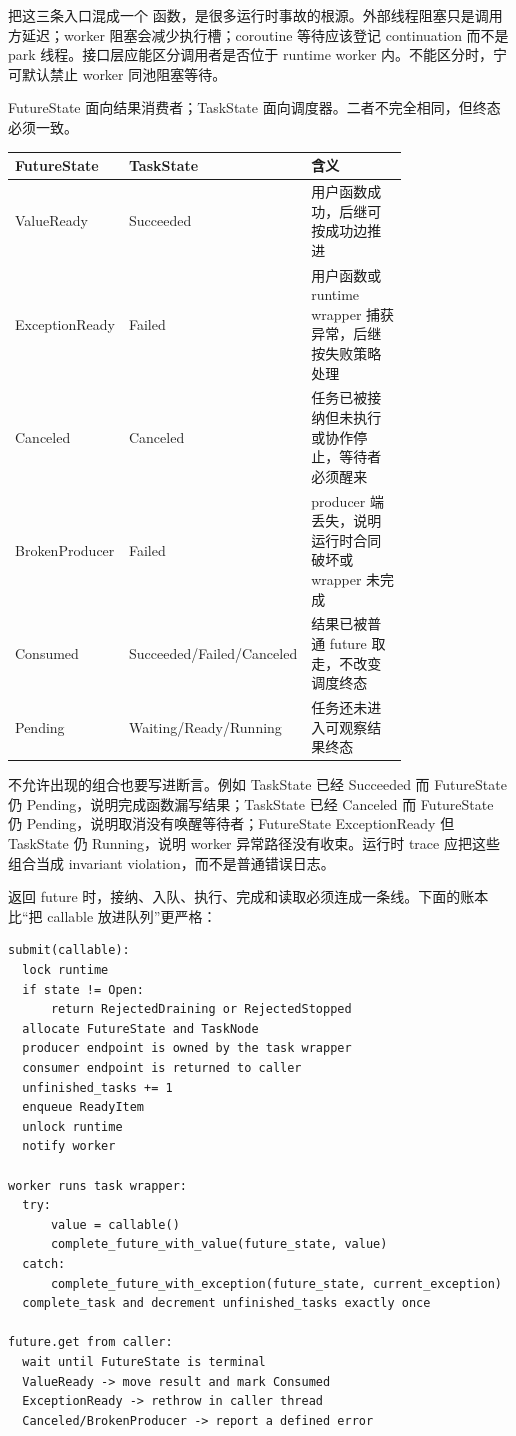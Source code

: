 把这三条入口混成一个  函数，是很多运行时事故的根源。外部线程阻塞只是调用方延迟；worker 阻塞会减少执行槽；coroutine 等待应该登记 continuation 而不是 park 线程。接口层应能区分调用者是否位于 runtime worker 内。不能区分时，宁可默认禁止 worker 同池阻塞等待。

FutureState 面向结果消费者；TaskState 面向调度器。二者不完全相同，但终态必须一致。

\begin{center}
\small
\begin{tabular}{p{0.20\linewidth}p{0.24\linewidth}p{0.34\linewidth}}
\toprule
FutureState & TaskState & 含义 \\
\midrule
ValueReady & Succeeded & 用户函数成功，后继可按成功边推进 \\
ExceptionReady & Failed & 用户函数或 runtime wrapper 捕获异常，后继按失败策略处理 \\
Canceled & Canceled & 任务已被接纳但未执行或协作停止，等待者必须醒来 \\
BrokenProducer & Failed & producer 端丢失，说明运行时合同破坏或 wrapper 未完成 \\
Consumed & Succeeded/Failed/Canceled & 结果已被普通 future 取走，不改变调度终态 \\
Pending & Waiting/Ready/Running & 任务还未进入可观察结果终态 \\
\bottomrule
\end{tabular}
\end{center}

不允许出现的组合也要写进断言。例如 TaskState 已经 Succeeded 而 FutureState 仍 Pending，说明完成函数漏写结果；TaskState 已经 Canceled 而 FutureState 仍 Pending，说明取消没有唤醒等待者；FutureState ExceptionReady 但 TaskState 仍 Running，说明 worker 异常路径没有收束。运行时 trace 应把这些组合当成 invariant violation，而不是普通错误日志。

 返回 future 时，接纳、入队、执行、完成和读取必须连成一条线。下面的账本比“把 callable 放进队列”更严格：

\begin{lstlisting}[numbers=none,caption={submit -> FutureState -> worker -> get 的账本}]
submit(callable):
  lock runtime
  if state != Open:
      return RejectedDraining or RejectedStopped
  allocate FutureState and TaskNode
  producer endpoint is owned by the task wrapper
  consumer endpoint is returned to caller
  unfinished_tasks += 1
  enqueue ReadyItem
  unlock runtime
  notify worker

worker runs task wrapper:
  try:
      value = callable()
      complete_future_with_value(future_state, value)
  catch:
      complete_future_with_exception(future_state, current_exception)
  complete_task and decrement unfinished_tasks exactly once

future.get from caller:
  wait until FutureState is terminal
  ValueReady -> move result and mark Consumed
  ExceptionReady -> rethrow in caller thread
  Canceled/BrokenProducer -> report a defined error
\end{lstlisting}

